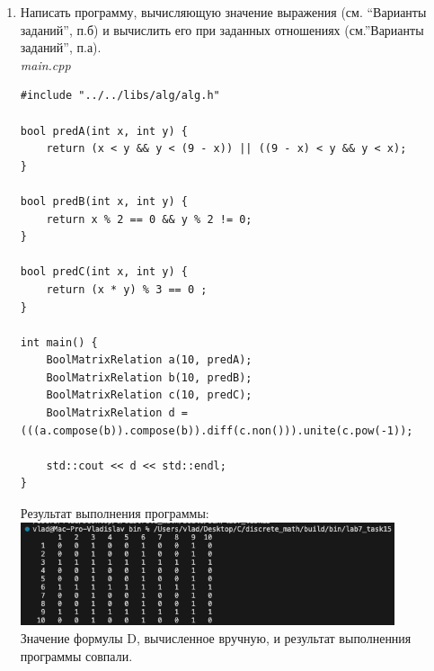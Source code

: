 \documentclass[a4paper,14pt]{extarticle}
\begin{document}
\begin{enumerate}[label=1.\arabic*.]
\begin{verbatim}
	return BoolMatrixRelation(size, [this, &b](int x, int y) {
		return data[x - 1][y - 1] ^ b.data[x - 1][y - 1];
	});
}
BoolMatrixRelation BoolMatrixRelation::non()
{
	return BoolMatrixRelation(size, [this](int x, int y) {
		return !data[x - 1][y - 1];
	});
}
BoolMatrixRelation BoolMatrixRelation::transpose()
{
	return BoolMatrixRelation(size, [this](int x, int y) {
		return data[y - 1][x - 1];
	});
}
BoolMatrixRelation BoolMatrixRelation::compose(BoolMatrixRelation b)
{
	if (this->size != b.size) return BoolMatrixRelation::getDefault();
	
	return BoolMatrixRelation(size, [this, &b](int x, int y) {
		for (int z = 0; z < size; z++) {
			if (data[x - 1][z] && b.data[z][y - 1])
			return true;
		}
		
		return false;
	});
}
BoolMatrixRelation BoolMatrixRelation::pow(int p)
{
	if (p < 0) return transpose();
	if (p == 0) return BoolMatrixRelation(size, [](int x, int y){return x == y;});
	if (p == 1) return *this;
	
	BoolMatrixRelation lowP = pow(p - 1);
	return compose(lowP);
}
\end{verbatim}
    \item Написать программу, вычисляющую значение выражения (см. “Варианты заданий”, п.б) и вычислить его при заданных отношениях (см.”Варианты заданий”, п.а).
    \\
    \textit{main.cpp}
    \begin{verbatim}
#include "../../libs/alg/alg.h"

bool predA(int x, int y) {
	return (x < y && y < (9 - x)) || ((9 - x) < y && y < x);
}

bool predB(int x, int y) {
	return x % 2 == 0 && y % 2 != 0;
}

bool predC(int x, int y) {
	return (x * y) % 3 == 0 ;
}

int main() {
	BoolMatrixRelation a(10, predA);
	BoolMatrixRelation b(10, predB);
	BoolMatrixRelation c(10, predC);
	BoolMatrixRelation d = (((a.compose(b)).compose(b)).diff(c.non())).unite(c.pow(-1));
	
	std::cout << d << std::endl;
}
    \end{verbatim}
    Результат выполнения программы:\\
    \includegraphics[width=110mm]{1.5}\\
Значение формулы D, вычисленное вручную, и результат выполненния программы совпали. 
 \end{enumerate}
    
\end{document}
